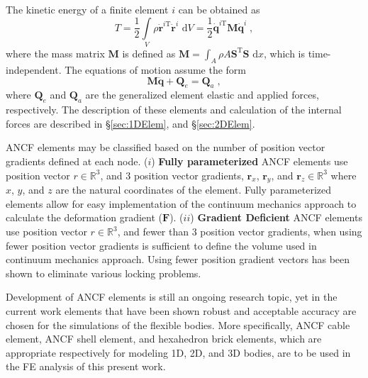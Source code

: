The kinetic energy of a finite element $i$ can be obtained as
\begin{equation} \label{eq:ANCF_T}
T = \frac{1}{2}\int\limits_V {\rho {{{\mathbf{\dot r}}}^{i\text{T}}}{\mathbf{\dot r}}^{i}} {\text{ d}}V = \frac{1}{2}{{\mathbf{\dot q}}^{i\text{T}}}{\mathbf{M\dot q}^{i}}\;,
\end{equation}
where the mass matrix ${\mathbf{M}}$ is defined as \small ${\mathbf{M}} = \int_A {\rho A {{\bm{S}}^\text{T}}{\bm{S}}} {\text{ d}}x$, which is time-independent. The equations of motion assume the form \cite{shabana2013} 
\begin{equation}
\mathbf{M} \ddot{\mathbf{q}} + \mathbf{{Q}}_e=\mathbf{{Q}}_a\;,
\end{equation}
where  $\mathbf{{Q}}_e$ and $\mathbf{{Q}}_a$ are the generalized element elastic and applied forces, respectively. The description of these elements and calculation of the internal forces are described in \S \ref{sec:1DElem}, and \S \ref{sec:2DElem}.

ANCF elements may be classified based on the number of position vector gradients defined at each node. ($i$) \textbf{Fully parameterized} ANCF elements use position vector $r \in \mathbb R^3$, and 3 position vector gradients, $\bm{r}_x$, $\bm{r}_y$, and $ \bm{r}_z  \in \mathbb R^3 $ where $x$, $y$, and $z$ are the natural coordinates of the element. Fully parameterized elements allow for easy implementation of the continuum mechanics approach to calculate the deformation gradient ($\textbf{F}$). ($ii$) \textbf{Gradient Deficient} ANCF elements use position vector $r \in \mathbb R^3$, and fewer than 3 position vector gradients, when using fewer position vector gradients is sufficient to define the volume used in continuum mechanics approach. Using fewer position gradient vectors has been shown to eliminate various locking problems.

Development of ANCF elements is still an ongoing research topic, yet in the current work elements that have been shown robust and acceptable accuracy  are chosen for the simulations of the flexible bodies. More specifically, ANCF cable element, ANCF shell element, and hexahedron brick elements, which are appropriate respectively for modeling 1D, 2D, and 3D bodies, are to be used in the FE analysis of this present work.



